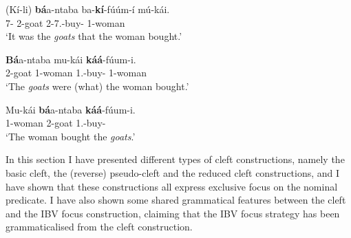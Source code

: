 \documentclass[output=paper,colorlinks,citecolor=brown,
]{langscibook}
\begin{document}
\begin{exe}
    \ex \label{159}
    \begin{xlist}
\ex
\label{159a}
\gll
(Kí-li) \textbf{bá}a-ntaba ba-\textbf{kí}-fúúm-í mú-kái.\\
7\Sm{}-\Cop{} 2-goat 2\Rel{}-7\Sm{}.\Pst{}-buy-\Pst{} 1-woman\\
\trans ‘It was the \textit{goats} that the woman bought.’

\ex
\label{159b}
\gll
\textbf{Bá}a-ntaba mu-kái \textbf{káá}-fúum-i.\\
2-goat 1-woman 1\Sm{}.\Pst{}-buy-\Pst{} 1-woman\\
\trans ‘The \textit{goats} were (what) the woman bought.’

\ex
\label{159c}
\gll
 Mu-kái \textbf{bá}a-ntaba \textbf{káá}-fúum-i.\\
1-woman 2-goat  1\Sm{}.\Pst{}-buy-\Pst{}\\
\trans ‘The woman bought the \textit{goats}.’

    \end{xlist}
\end{exe}
In this section I have presented different types of cleft constructions, namely the basic cleft, the (reverse) pseudo-cleft and the reduced cleft constructions, and I have shown that these constructions all express exclusive focus on the nominal predicate. I have also shown some shared grammatical features between the cleft and the IBV focus construction, claiming that the IBV focus strategy has been grammaticalised from the cleft construction.
\end{document}
